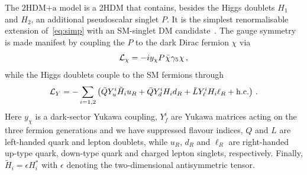 \documentclass[a4paper, 11pt,notoc]{article}
\newcommand{\hdma}{\ensuremath{\textrm{2HDM+a}}\xspace}
\begin{document}
The \hdma model is a 2HDM that contains, besides the Higgs doublets $H_1$ and $H_2$, an additional pseudoscalar singlet $P$. It is the simplest renormalisable extension of~\eqref{eq:simp} with an SM-singlet DM candidate~\cite{Ipek:2014gua,No:2015xqa,Goncalves:2016iyg,Bauer:2017ota,Tunney:2017yfp}. The gauge symmetry is made manifest by coupling the $P$ to the dark Dirac fermion  $\chi$ via
\begin{equation} \label{eq:Lx}
{\cal L}_\chi = - i y_\chi P \hspace{0.25mm} \bar \chi \hspace{0.25mm} \gamma_5 \hspace{0.1mm} \chi \,,
\end{equation}
while the Higgs doublets couple to the SM fermions through
\begin{equation} \label{eq:LY}
{\cal L}_{Y} = - \sum_{i=1,2} \left ( \bar Q Y_u^i \tilde H_i u_R  + \bar Q Y_d^i H_i d_R   + \bar L Y_\ell^i H_i \ell_R  + {\rm h.c.}  \right ) \,.
\end{equation}
Here $y_\chi$ is a dark-sector Yukawa coupling, $Y_f^i$ are Yukawa matrices acting on the three fermion generations and we have suppressed flavour indices, $Q$ and $L$ are left-handed quark and lepton doublets, while $u_R$, $d_R$ and $\ell_R$ are right-handed up-type quark, down-type quark and charged lepton singlets, respectively. Finally, $\tilde H_i = \epsilon H_i^\ast$ with $\epsilon$ denoting the  two-dimensional antisymmetric tensor.
\end{document}
